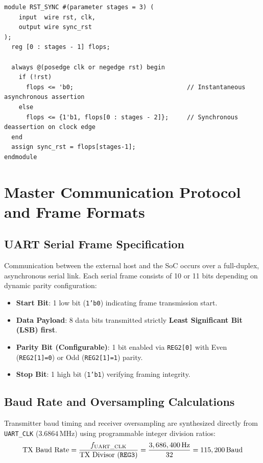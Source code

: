 \documentclass[11pt,a4paper]{article}
\begin{document}
\begin{lstlisting}[caption={RTL Implementation of the Reset Synchronizer (RST\_SYNC.v).}]
module RST_SYNC #(parameter stages = 3) (
    input  wire rst, clk,
    output wire sync_rst
);
  reg [0 : stages - 1] flops;

  always @(posedge clk or negedge rst) begin
    if (!rst)
      flops <= 'b0;                               // Instantaneous asynchronous assertion
    else
      flops <= {1'b1, flops[0 : stages - 2]};     // Synchronous deassertion on clock edge
  end
  assign sync_rst = flops[stages-1];
endmodule
\end{lstlisting}

\section{Master Communication Protocol and Frame Formats}

\subsection{UART Serial Frame Specification}
Communication between the external host and the SoC occurs over a full-duplex, asynchronous serial link. Each serial frame consists of 10 or 11 bits depending on dynamic parity configuration:
\begin{itemize}
    \item \textbf{Start Bit}: 1 low bit (\texttt{1'b0}) indicating frame transmission start.
    \item \textbf{Data Payload}: 8 data bits transmitted strictly \textbf{Least Significant Bit (LSB) first}.
    \item \textbf{Parity Bit (Configurable)}: 1 bit enabled via \texttt{REG2[0]} with Even (\texttt{REG2[1]=0}) or Odd (\texttt{REG2[1]=1}) parity.
    \item \textbf{Stop Bit}: 1 high bit (\texttt{1'b1}) verifying framing integrity.
\end{itemize}

\subsection{Baud Rate and Oversampling Calculations}
Transmitter baud timing and receiver oversampling are synthesized directly from \texttt{UART\_CLK} ($3.6864\,\text{MHz}$) using programmable integer division ratios:
\begin{equation}
\text{TX Baud Rate} = \frac{f_{\text{UART\_CLK}}}{\text{TX Divisor (\texttt{REG3})}} = \frac{3,686,400\,\text{Hz}}{32} = 115,200\,\text{Baud}
\end{equation}
\end{document}
